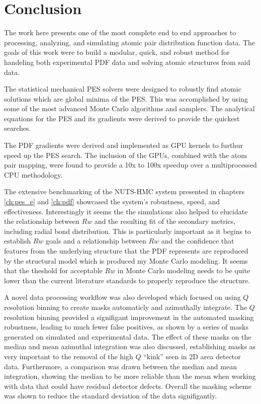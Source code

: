 \chapter{Conclusion}
The work here presents one of the most complete end to end approaches to processing, analyzing, and simulating atomic pair distribution function data.
The goals of this work were to build a modular, quick, and robust method for handeling both experimental PDF data and solving atomic structures from said data.

The statistical mechanical PES solvers were designed to robustly find atomic solutions which are global minima of the PES.
This was accomplished by using some of the most advanced Monte Carlo algorithms and samplers.
The analytical equations for the PES and its gradients were derived to provide the quickest searches.

The PDF gradients were derived and implemented as GPU kernels to furthur speed up the PES search.
The inclusion of the GPUs, combined with the atom pair mapping, were found to provide a 10x to 100x speedup over a multiprocessed CPU methodology.

The extensive benchmarking of the NUTS-HMC system presented in chapters \ref{ch:pes_e} and \ref{ch:pdf} showcased the system's robustness, speed, and effectiveness.
Interestingly it seems the the simulations also helped to elucidate the relationship between $Rw$ and the resulting fit of the secondary metrics, including radial bond distribution.
This is particularly important as it begins to establish $Rw$ goals and a relationship between $Rw$ and the confidence that features from the underlying structure that the PDF represents are reproduced by the structural model which is produced my Monte Carlo modeling.
It seems that the theshold for acceptable $Rw$ in Monte Carlo modeling needs to be quite lower than the current literature standards to properly reproduce the structure.

A novel data processing workflow was also developed which focused on using $Q$ resolution binning to create masks automaticly and azimuthally integrate.
The $Q$ resolution binning provided a signifigant improvement in the automated masking robustness, leading to much fewer false positives, as shown by a series of masks generated on simulated and experimental data.
The effect of these masks on the median and mean azimuthal integration was also discussed, establishing masks as very important to the removal of the high $Q$ ``kink'' seen in 2D area detector data.
Furthermore, a comparison was drawn between the median and mean integration, showing the median to be more reliable than the mean when working with data that could have residual detector defects.
Overall the masking scheme was shown to reduce the standard deviation of the data signifigantly.

